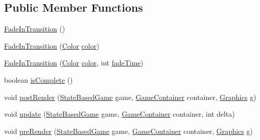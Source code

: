 \subsection*{Public Member Functions}
\begin{DoxyCompactItemize}
\item 
\mbox{\hyperlink{classorg_1_1newdawn_1_1slick_1_1state_1_1transition_1_1_fade_in_transition_ad0160e08d177504d05b16ed947a3bbc2}{Fade\+In\+Transition}} ()
\item 
\mbox{\hyperlink{classorg_1_1newdawn_1_1slick_1_1state_1_1transition_1_1_fade_in_transition_aa149b336bd50637a67acfc8572d700ae}{Fade\+In\+Transition}} (\mbox{\hyperlink{classorg_1_1newdawn_1_1slick_1_1_color}{Color}} \mbox{\hyperlink{classorg_1_1newdawn_1_1slick_1_1state_1_1transition_1_1_fade_in_transition_afaaf133a75453117cbd4250e93f375fc}{color}})
\item 
\mbox{\hyperlink{classorg_1_1newdawn_1_1slick_1_1state_1_1transition_1_1_fade_in_transition_af13c865a6108873ebbbbff122874dc52}{Fade\+In\+Transition}} (\mbox{\hyperlink{classorg_1_1newdawn_1_1slick_1_1_color}{Color}} \mbox{\hyperlink{classorg_1_1newdawn_1_1slick_1_1state_1_1transition_1_1_fade_in_transition_afaaf133a75453117cbd4250e93f375fc}{color}}, int \mbox{\hyperlink{classorg_1_1newdawn_1_1slick_1_1state_1_1transition_1_1_fade_in_transition_af06dd5e9b2e7da8c3f38d2da3e54e435}{fade\+Time}})
\item 
boolean \mbox{\hyperlink{classorg_1_1newdawn_1_1slick_1_1state_1_1transition_1_1_fade_in_transition_a449fa6073e39419c2689267e3ca18ca4}{is\+Complete}} ()
\item 
void \mbox{\hyperlink{classorg_1_1newdawn_1_1slick_1_1state_1_1transition_1_1_fade_in_transition_ae1edbafe81aaa69c2d570d78f3e33c76}{post\+Render}} (\mbox{\hyperlink{classorg_1_1newdawn_1_1slick_1_1state_1_1_state_based_game}{State\+Based\+Game}} game, \mbox{\hyperlink{classorg_1_1newdawn_1_1slick_1_1_game_container}{Game\+Container}} container, \mbox{\hyperlink{classorg_1_1newdawn_1_1slick_1_1_graphics}{Graphics}} g)
\item 
void \mbox{\hyperlink{classorg_1_1newdawn_1_1slick_1_1state_1_1transition_1_1_fade_in_transition_ac5e00c42c8595a375d284e1d8b0c2b93}{update}} (\mbox{\hyperlink{classorg_1_1newdawn_1_1slick_1_1state_1_1_state_based_game}{State\+Based\+Game}} game, \mbox{\hyperlink{classorg_1_1newdawn_1_1slick_1_1_game_container}{Game\+Container}} container, int delta)
\item 
void \mbox{\hyperlink{classorg_1_1newdawn_1_1slick_1_1state_1_1transition_1_1_fade_in_transition_a393e56290e2fe2bb5d8c6fde7d11b3a2}{pre\+Render}} (\mbox{\hyperlink{classorg_1_1newdawn_1_1slick_1_1state_1_1_state_based_game}{State\+Based\+Game}} game, \mbox{\hyperlink{classorg_1_1newdawn_1_1slick_1_1_game_container}{Game\+Container}} container, \mbox{\hyperlink{classorg_1_1newdawn_1_1slick_1_1_graphics}{Graphics}} g)

\end{DoxyCompactItemize}
